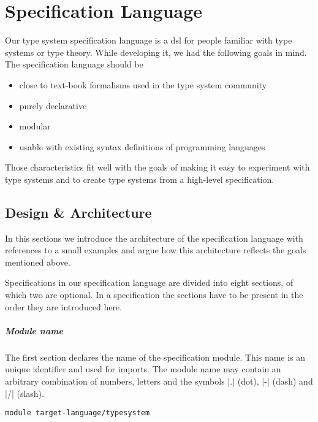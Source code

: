 \chapter{Specification Language}
\label{cha:spec-lang}
Our type system specification language is a \gls{dsl} for people
familiar with type systems or type theory. While developing it, we had
the following goals in mind. The specification language should be

\begin{itemize}
\item close to text-book formalisms used in the type system community
\item purely declarative
\item modular
\item usable with existing syntax definitions of programming languages
\end{itemize}

Those characteristics fit well with the goals of making it easy to
experiment with type systems and to create type systems from a
high-level specification.
\section{Design \& Architecture}
\label{sec:design--architecture}
In this sections we introduce the architecture of the specification
language with references to a small examples and argue how this
architecture reflects the goals mentioned above.

Specifications in our specification language are divided into eight
sections, of which two are optional. In a specification the sections
have to be present in the order they are introduced here.

\paragraph{Module name} The first section declares the name of the
specification module. This name is an unique identifier and used for
imports. The module name may contain an arbitrary combination of
numbers, letters and the symbols \code|.| (dot), \code|-| (dash) and
\code|/| (slash).

\begin{example}{}
\begin{lstlisting}[language=sltc]
module target-language/typesystem
\end{lstlisting}
\label{ex:module-section}
\end{example}

